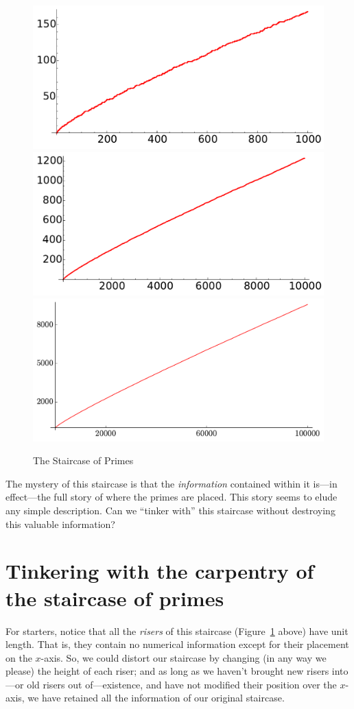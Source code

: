 \documentclass[openany]{book}
\theoremstyle{plain}
\theoremstyle{definition}
\begin{document}
{\begin{figure}[H]
\includegraphics[width=.4\textwidth]{illustrations/PN_1000}
\includegraphics[width=.4\textwidth]{illustrations/PN_10000}\\

\includegraphics[width=.8\textwidth]{illustrations/PN_100000}


\caption{The Staircase of Primes\label{fig:staircases}}
\end{figure}

The mystery of this staircase is that the {\em information} contained
within it is---in effect---the full story of where the primes are
placed. This story seems to elude any simple description.  Can we
``tinker with'' this staircase without destroying this valuable
information?




\chapter[Tinkering with the staircase of primes]{Tinkering with the carpentry of the staircase of primes\label{sec:tinkering}}


For starters, notice that all the {\em risers} of this staircase (Figure~\ref{fig:staircases} above) have
unit length. That is, they contain no numerical information except for
their placement on the $x$-axis. So, we could distort our staircase by
changing (in any way we please) the height of each riser; and as long
as we haven't brought new risers into---or old risers out
of---existence, and have not modified their position over the
$x$-axis, we have retained all the information of our original
staircase.


}
\end{document}
